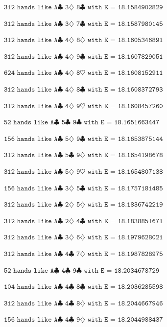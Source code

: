 \documentclass[letter,12pt]{article}
\begin{document}
{$\texttt{312 hands like A$\clubsuit$ 3$\diamondsuit$ 8$\clubsuit$ with E = 18.1584902829}$

$\texttt{312 hands like A$\clubsuit$ 3$\diamondsuit$ 7$\clubsuit$ with E = 18.1587980145}$

$\texttt{312 hands like A$\clubsuit$ 4$\diamondsuit$ 8$\diamondsuit$ with E = 18.1605346891}$

$\texttt{312 hands like A$\clubsuit$ 4$\diamondsuit$ 9$\clubsuit$ with E = 18.1607829051}$

$\texttt{624 hands like A$\clubsuit$ 4$\diamondsuit$ 8$\heartsuit$ with E = 18.1608152911}$

$\texttt{312 hands like A$\clubsuit$ 4$\diamondsuit$ 8$\clubsuit$ with E = 18.1608372793}$

$\texttt{312 hands like A$\clubsuit$ 4$\diamondsuit$ 9$\heartsuit$ with E = 18.1608457260}$

$\texttt{52 hands like A$\clubsuit$ 5$\clubsuit$ 9$\clubsuit$ with E = 18.1651663447}$

$\texttt{156 hands like A$\clubsuit$ 5$\diamondsuit$ 9$\clubsuit$ with E = 18.1653875144}$

$\texttt{312 hands like A$\clubsuit$ 5$\clubsuit$ 9$\diamondsuit$ with E = 18.1654198678}$

$\texttt{312 hands like A$\clubsuit$ 5$\diamondsuit$ 9$\heartsuit$ with E = 18.1654807138}$

$\texttt{156 hands like A$\clubsuit$ 3$\diamondsuit$ 5$\clubsuit$ with E = 18.1757181485}$

$\texttt{312 hands like A$\clubsuit$ 2$\diamondsuit$ 5$\diamondsuit$ with E = 18.1836742219}$

$\texttt{312 hands like A$\clubsuit$ 2$\diamondsuit$ 4$\clubsuit$ with E = 18.1838851671}$

$\texttt{312 hands like A$\clubsuit$ 3$\diamondsuit$ 6$\diamondsuit$ with E = 18.1979628021}$

$\texttt{312 hands like A$\clubsuit$ 4$\clubsuit$ 7$\diamondsuit$ with E = 18.1987828975}$

$\texttt{52 hands like A$\clubsuit$ 4$\clubsuit$ 9$\clubsuit$ with E = 18.2034678729}$

$\texttt{104 hands like A$\clubsuit$ 4$\clubsuit$ 8$\clubsuit$ with E = 18.2036285598}$

$\texttt{312 hands like A$\clubsuit$ 4$\clubsuit$ 8$\diamondsuit$ with E = 18.2044667946}$

$\texttt{156 hands like A$\clubsuit$ 4$\clubsuit$ 9$\diamondsuit$ with E = 18.2044988437}$

}
\end{document}

